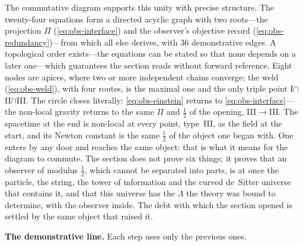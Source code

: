The commutative diagram supports this unity with precise structure. The twenty-four
equations form a directed acyclic graph with two roots---the projection $\Pi$
(\eqref{eq:obs-interface}) and the observer's objective record
(\eqref{eq:obs-redundancy})---from which all else derives, with $36$ demonstrative edges.
A topological order exists---the equations can be stated so that none depends on a later
one---which guarantees the section reads without forward reference. Eight nodes are apices,
where two or more independent chains converge; the weld (\eqref{eq:obs-weld}), with four
routes, is the maximal one and the only triple point I${\cap}$II${\cap}$III. The circle
closes literally: \eqref{eq:obs-einstein} returns to \eqref{eq:obs-interface}---the
non-local gravity returns to the same $\Pi$ and $\tfrac12$ of the opening, III${\to}$III.
The spacetime at the end is non-local at every point, type~III, as the field at the start,
and its Newton constant is the same $\tfrac12$ of the object one began with. One enters by
any door and reaches the same object: that is what it means for the diagram to commute.
The section does not prove six things; it proves that an observer of modulus $\tfrac12$,
which cannot be separated into parts, is at once the particle, the string, the tower of
information and the curved de~Sitter universe that contains it, and that this universe has
the $\Lambda$ the theory was bound to determine, with the observer inside. The debt with
which the section opened is settled by the same object that raised it.

\medskip\noindent\textbf{The demonstrative line.} Each step uses only the previous ones.


